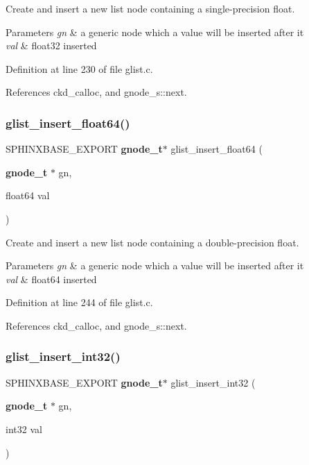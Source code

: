 Create and insert a new list node containing a single-\/precision float. 


\begin{DoxyParams}{Parameters}
{\em gn} & a generic node which a value will be inserted after it \\
\hline
{\em val} & float32 inserted \\
\hline
\end{DoxyParams}


Definition at line 230 of file glist.\+c.



References ckd\+\_\+calloc, and gnode\+\_\+s\+::next.

\mbox{\label{glist_8h_a97a682e38319dd8f67765732467110f9}} 
\subsubsection{glist\+\_\+insert\+\_\+float64()}
{\footnotesize\ttfamily S\+P\+H\+I\+N\+X\+B\+A\+S\+E\+\_\+\+E\+X\+P\+O\+RT \textbf{ gnode\+\_\+t}$\ast$ glist\+\_\+insert\+\_\+float64 (\begin{DoxyParamCaption}\item[{\textbf{ gnode\+\_\+t} $\ast$}]{gn,  }\item[{float64}]{val }\end{DoxyParamCaption})}



Create and insert a new list node containing a double-\/precision float. 


\begin{DoxyParams}{Parameters}
{\em gn} & a generic node which a value will be inserted after it \\
\hline
{\em val} & float64 inserted \\
\hline
\end{DoxyParams}


Definition at line 244 of file glist.\+c.



References ckd\+\_\+calloc, and gnode\+\_\+s\+::next.

\mbox{\label{glist_8h_a327b6478ee05ac17e3c3b3189579413e}} 
\subsubsection{glist\+\_\+insert\+\_\+int32()}
{\footnotesize\ttfamily S\+P\+H\+I\+N\+X\+B\+A\+S\+E\+\_\+\+E\+X\+P\+O\+RT \textbf{ gnode\+\_\+t}$\ast$ glist\+\_\+insert\+\_\+int32 (\begin{DoxyParamCaption}\item[{\textbf{ gnode\+\_\+t} $\ast$}]{gn,  }\item[{int32}]{val }\end{DoxyParamCaption})}



